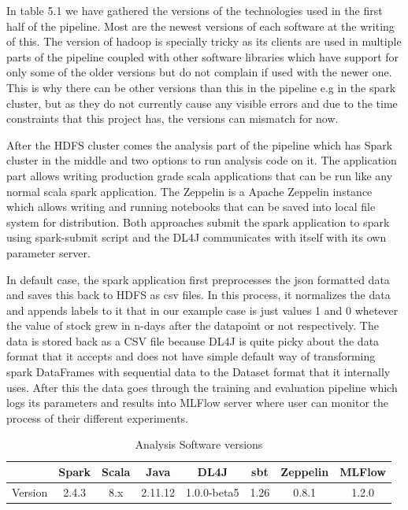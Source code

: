 In table 5.1 we have gathered the versions of the technologies used in the first half of the pipeline.
Most are the newest versions of each software at the writing of this.
The version of hadoop is specially tricky as its clients are used in multiple parts of the pipeline coupled with other software libraries which have support for only some of the older versions but do not complain if used with the newer one.
This is why there can be other versions than this in the pipeline e.g in the spark cluster, but as they do not currently cause any visible errors and due to the time constraints that this project has, the versions can mismatch for now.

After the HDFS cluster comes the analysis part of the pipeline which has Spark cluster in the middle and two options to run analysis code on it.
The application part allows writing production grade scala applications that can be run like any normal scala spark application.
The Zeppelin is a Apache Zeppelin instance which allows writing and running notebooks that can be saved into local file system for distribution.
Both approaches submit the spark application to spark using spark-submit script and the DL4J communicates with itself with its own parameter server.

In default case, the spark application first preprocesses the json formatted data and saves this back to HDFS as csv files.
In this process, it normalizes the data and appends labels to it that in our example case is just values 1 and 0 whetever the value of stock grew in n-days after the datapoint or not respectively.
The data is stored back as a CSV file because DL4J is quite picky about the data format that it accepts and does not have simple default way of transforming spark DataFrames with sequential data to the Dataset format that it internally uses.
After this the data goes through the training and evaluation pipeline which logs its parameters and results into MLFlow server where user can monitor the process of their different experiments.

\begin{table}[! htbp]\centering
    \caption{Analysis Software versions}
    \begin{threeparttable}
        \begin{tabular}{|c|c|c|c|c|c|c|c|} 
        \hline
        & Spark & Scala & Java & DL4J & sbt & Zeppelin & MLFlow \\ \hline
        Version & 2.4.3 & 8.x & 2.11.12 & 1.0.0-beta5 & 1.26 & 0.8.1 & 1.2.0\\
        \hline
        \end{tabular}
    \end{threeparttable}
\end{table}

